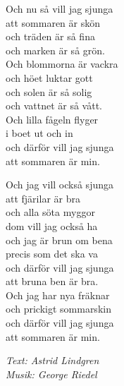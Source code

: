 \vspace{10pt}
Och nu så vill jag sjunga\\
att sommaren är skön\\
och träden är så fina\\
och marken är så grön.\\
Och blommorna är vackra\\
och höet luktar gott\\
och solen är så solig\\
och vattnet är så vått.\\
Och lilla fågeln flyger\\
i boet ut och in\\
och därför vill jag sjunga\\
att sommaren är min.\par
\vspace{10pt}
Och jag vill också sjunga\\
att fjärilar är bra\\
och alla söta myggor\\
dom vill jag också ha\\
och jag är brun om bena\\
precis som det ska va\\
och därför vill jag sjunga\\
att bruna ben är bra.\\
Och jag har nya fräknar\\
och prickigt sommarskin\\
och därför vill jag sjunga\\
att sommaren är min.
\par
\vspace{10pt}
{\footnotesize\textit{Text: Astrid Lindgren\\ Musik: George Riedel}}
